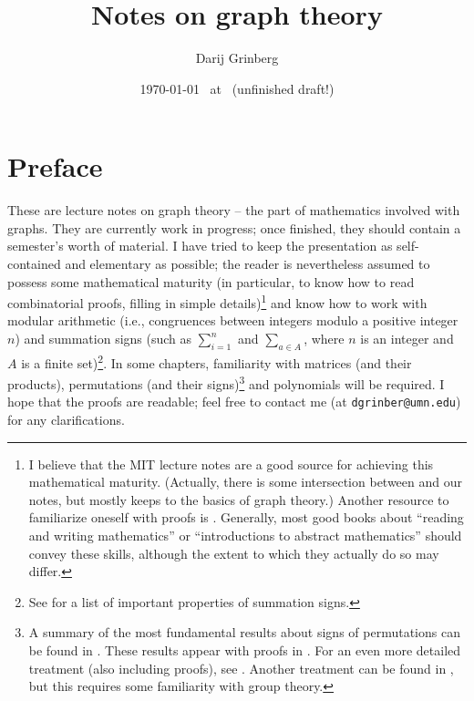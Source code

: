 \documentclass[numbers=enddot,12pt,final,onecolumn,notitlepage]{scrartcl}%
\theoremstyle{definition}
\let\sumnonlimits\sum
\renewcommand{\sum}{\sumnonlimits\limits}
\begin{document}
\title{Notes on graph theory}
\author{Darij Grinberg}
\date{
\today\ 
at \DTMcurrenttime\ 
(unfinished draft!)}
\maketitle
\tableofcontents

\section{Preface}

These are lecture notes on graph theory -- the part of mathematics
involved with graphs. They are currently work in
progress; once finished, they should contain a semester's worth of
material. I have tried to keep the presentation as self-contained and
elementary as possible; the reader is nevertheless assumed to possess
some mathematical maturity (in particular, to know how to read
combinatorial proofs, filling in simple details)\footnote{I believe
that the MIT lecture notes \cite{LeLeMe16} are a good source for
achieving this mathematical maturity. (Actually, there is some
intersection between \cite[Chapter 12]{LeLeMe16} and our notes, but
\cite{LeLeMe16} mostly keeps to the basics of graph theory.)
Another resource to familiarize oneself with proofs is
\cite{Day-proofs}. Generally, most good books about ``reading and
writing mathematics'' or ``introductions to abstract mathematics''
should convey these skills, although the extent to which they actually
do so may differ.}
and know how to work
with modular arithmetic (i.e., congruences between integers modulo a
positive integer $n$) and summation signs (such as $\sum_{i=1}^n$ and
$\sum_{a \in A}$, where $n$ is an integer and $A$ is a finite
set)\footnote{See \cite[\S 1.3]{detnotes} for a list of important
properties of summation signs.}.
In some chapters, familiarity with matrices (and their products),
permutations (and their signs)\footnote{A summary of the most
fundamental results about signs of permutations can be found in
\cite[\S 8.1]{LaNaSc16}. These results appear with proofs in
\cite[Chapter 6.B]{Day-proofs}. For an even more detailed treatment
(also including proofs),
see \cite[\S 4.1--4.3]{detnotes}. Another treatment can be found in
\cite{Conrad-sign}, but this requires some familiarity with group
theory.}
and polynomials will be required.
I hope that the proofs are readable; feel free to contact me (at
\texttt{dgrinber@umn.edu}) for any clarifications.
\end{document}
